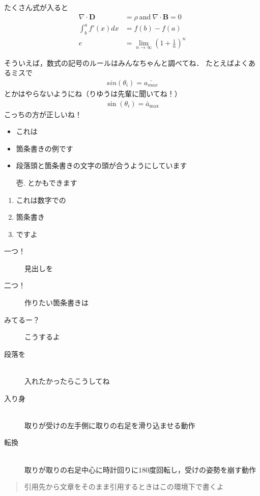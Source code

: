 \documentclass[platex,dvipdfmx]{jlreq}%
\numberwithin{equation}{section}%
\begin{document}
たくさん式が入ると
\begin{align}
 \nabla \cdot \mathbf{D} & =\rho \ \mathrm{and} \ \nabla \cdot \mathbf{B} =0\ \\
 \int ^{a}_{b} f'( x) dx & = f( b) -f( a)\\
 e &= \lim\limits _{n\rightarrow \infty }\left( 1+\frac{1}{n}\right)^{n}
\end{align}

そういえば，数式の記号のルールはみんなちゃんと調べてね．
たとえばよくあるミスで
\begin{align}
  sin(\theta_i) = \bar{a_{max}}
\end{align}
とかはやらないようにね（りゆうは先輩に聞いてね！）
\begin{align}
  \sin(\theta_i) = \bar{a}_{\textrm{max}}
\end{align}
こっちの方が正しいね！

\begin{itemize}
 \item これは
 \item 箇条書きの例です
 \item 段落頭と箇条書きの文字の頭が合うようにしています
 \item[壱.] とかもできます 
\end{itemize}

\begin{enumerate}
 \item これは数字での
 \item 箇条書き
 \item ですよ
\end{enumerate}

\begin{description}
 \item[一つ！] 見出しを
 \item[二つ！] 作りたい箇条書きは
 \item[みてるー？] こうするよ 
 \item[段落を]\mbox{}\\
	    入れたかったらこうしてね
 \item[入り身]\mbox{}\\
	    取りが受けの左手側に取りの右足を滑り込ませる動作
 \item[転換]\mbox{}\\
	    取りが取りの右足中心に時計回りに$180$度回転し，受けの姿勢を崩す動作
\end{description}



\begin{quotation}
 引用先から文章をそのまま引用するときはこの環境下で書くよ
\end{quotation}
\end{document}
